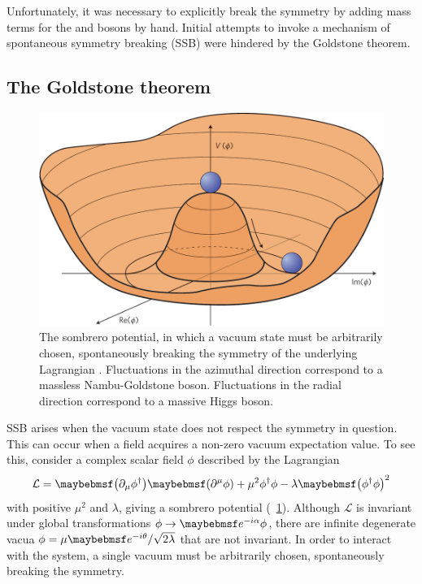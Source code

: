 Unfortunately, it was necessary to explicitly break the symmetry by adding mass terms for 
the \PWpm and \PZ bosons by hand. Initial attempts to invoke a mechanism of spontaneous 
symmetry breaking (SSB) were hindered by the Goldstone theorem.



\subsection{The Goldstone theorem}
\label{sec:ewsb:goldstone}

\begin{figure}[t]
	\includegraphics[width=\mediumfigwidth]{tex/motivation/sombrero}
	\caption{The sombrero potential, in which a vacuum state must be arbitrarily chosen, 
	spontaneously breaking the symmetry of the underlying Lagrangian \cite{Alvarez:2011}.
	Fluctuations in the azimuthal direction correspond to a massless Nambu-Goldstone 
	boson. Fluctuations in the radial direction correspond to a massive Higgs boson.}
	\label{fig:sombrero}
\end{figure}

SSB arises when the vacuum state does not respect the symmetry in question. This can 
occur when a field acquires a non-zero vacuum expectation value. To see this, consider a 
complex scalar field $\phi$ described by the Lagrangian
\begin{equation}
	\mathcal{L} 
	= \parenths{\partial_{\mu}\phi^{\dagger}} \parenths{\partial^{\mu}\phi} 
	+ \mu^2 \phi^{\dagger}\phi - \lambda \parenths{\phi^{\dagger}\phi}^2
	\label{eq:lagr:goldstone}
\end{equation}
with positive $\mu^2$ and $\lambda$, giving a sombrero potential 
(\Figure~\ref{fig:sombrero}). 
Although $\mathcal{L}$ is invariant under global  transformations 
$\phi \rightarrow \eexp{-i\alpha} \phi$, there are infinite degenerate vacua
$\phi = \mu\eexp{-i\theta}/\sqrt{2\lambda}$ that are not invariant. In order to interact 
with the system, a single vacuum must be arbitrarily chosen, spontaneously breaking the 
 symmetry.

